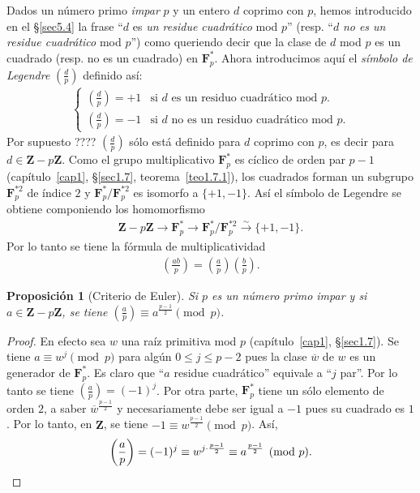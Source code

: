 \documentclass[10pt,oneside,bibtotoc,smallheadings,leqno,a5paper,DIV=12]{scrbook}
\newcommand{\ZZ}{\mathbf{Z}}
\newcommand{\FF}{\mathbf{F}}
\newcommand{\oline}[1]{\overline{#1}}
\renewcommand{\to}[1][]{\xrightarrow{#1}}
\newcommand{\leg}[2]{\left(\frac{#1}{#2}\right)}
\numberwithin{equation}{section}
\theoremstyle{defi}
\theoremstyle{enonce}
\newtheorem{proposition}{Proposici\'on}
\theoremstyle{rem}
\numberwithin{theorem}{section}
\numberwithin{proposition}{section}
\numberwithin{definition}{section}
\numberwithin{lemma}{section}
\numberwithin{corollary}{section}
\numberwithin{example}{section}
\numberwithin{footnote}{section}%
\begin{document}
Dados un n\'umero primo {\em impar} $p$ y un entero $d$ coprimo con $p$, hemos introducido en el \S\ref{sec5.4}
la frase ``$d$ es {\em un residue cuadr\'atico} mod $p$'' (resp. ``$d$ {\em no es un residue cuadr\'atico}
mod $p$'') como queriendo decir que la clase de $d$ mod $p$ es un cuadrado (resp. no es un cuadrado) en
$\FF_{p}^{*}$. Ahora introducimos aqu\'i el {\em s\'imbolo de Legendre} $\left(\frac{d}{p}\right)$ definido
as\'i:
\begin{gather}
\begin{cases}
\left(\frac{d}{p}\right) = +1  & \text{si $d$ es un residuo cuadr\'atico mod $p$.}\\
\left(\frac{d}{p}\right) = -1 & \text{si $d$ no es un residuo cuadr\'atico mod $p$.}
\end{cases}
\end{gather}
Por supuesto ???? $\leg{d}{p}$ s\'olo est\'a definido para $d$ coprimo con $p$, es decir para
$d\in\ZZ-p\ZZ$. Como el grupo multiplicativo $\FF_{p}^{*}$ es c\'iclico de orden par $p-1$
(cap\'itulo~\ref{cap1}, \S\ref{sec1.7}, teorema~\ref{teo1.7.1}), los cuadrados forman un subgrupo $\FF_{p}^{*2}$ de \'indice $2$ y
$\FF_{p}^{*}/\FF_{p}^{*2}$ es isomorfo a $\{+1,-1\}$. As\'i el s\'imbolo de Legendre se obtiene componiendo
los homomorfismo
\begin{gather*}
\ZZ-p\ZZ\to\FF_{p}^{*}\to\FF_{p}^{*}/\FF_{p}^{*2}\to[\sim]\{+1,-1\}.
\end{gather*}
Por lo tanto se tiene la f\'ormula de multiplicatividad
\begin{gather}\label{eq-5.5-2}
\leg{ab}{p} = \leg{a}{p}\leg{b}{p}.
\end{gather}

\begin{proposition}[Criterio de Euler]\label{prop5.5.1}
Si $p$ es un n\'umero primo impar y si $a\in\ZZ-p\ZZ$, se tiene $\leg{a}{p}\equiv a^{\frac{p-1}{2}}\pmod p$.
\end{proposition}

\begin{proof}
En efecto sea $w$ una ra\'iz primitiva mod $p$ (cap\'itulo~\ref{cap1}, \S\ref{sec1.7}). Se tiene
$a\equiv w^{j}\pmod p$ para alg\'un $0\leq j\leq p-2$ pues la clase $\oline w$ de $w$ es un generador
de $\FF_{p}^{*}$. Es claro que ``$a$ residue cuadr\'atico'' equivale a ``$j$ par''. Por lo tanto se tiene
$\leg{a}{p}=(-1)^{j}$. Por otra parte, $\FF_{p}^{*}$ tiene un s\'olo elemento de orden $2$, a saber
$\oline w^{\frac{p-1}{2}}$ y necesariamente debe ser igual a $-1$ pues su cuadrado es $1$. Por lo tanto,
en $\ZZ$, se tiene $-1\equiv w^{\frac{p-1}{2}}\pmod p$. As\'i,
\begin{gather*}
\leg{a}{p}=(-1)^{j}\equiv w^{j\cdot\frac{p-1}{2}}\equiv a^{\frac{p-1}{2}}\pmod p.\qedhere
\end{gather*}
\end{proof}
\end{document}

